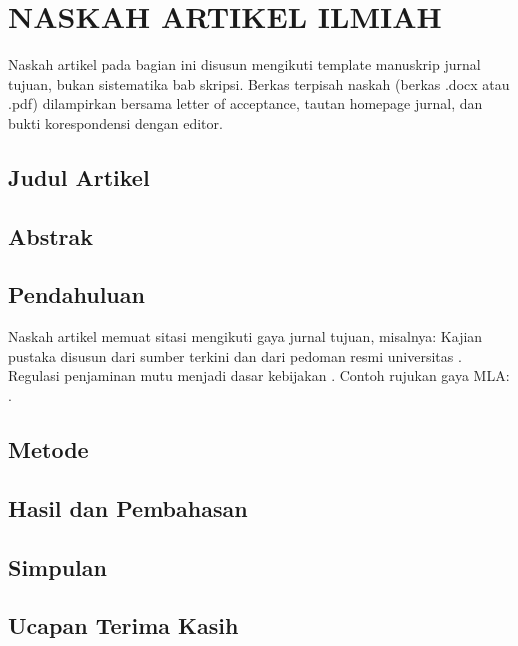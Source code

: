 \chapter{NASKAH ARTIKEL ILMIAH}
Naskah artikel pada bagian ini disusun mengikuti template manuskrip jurnal tujuan, bukan
sistematika bab skripsi. Berkas terpisah naskah (berkas .docx atau .pdf) dilampirkan bersama
letter of acceptance, tautan homepage jurnal, dan bukti korespondensi dengan editor.

\section{Judul Artikel}
\section{Abstrak}
\section{Pendahuluan}
Naskah artikel memuat sitasi mengikuti gaya jurnal tujuan, misalnya:
Kajian pustaka disusun dari sumber terkini \citep{creswell2018research, patten2017understanding}
dan dari pedoman resmi universitas \citep{unnes2024panduanakademik}. Regulasi penjaminan mutu
menjadi dasar kebijakan \citep{permendikbudristek2023}.
 Contoh rujukan gaya MLA: .

\section{Metode}
\section{Hasil dan Pembahasan}
\section{Simpulan}
\section{Ucapan Terima Kasih}
